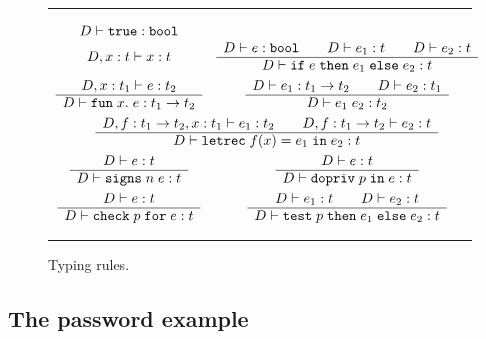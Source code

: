 \documentclass[submission,copyright,creativecommons]{eptcs}
\newcommand{\Rule}[2]{          \begin{array}{c}
  #1 \\\hline
  #2
  \end{array}}
\newcommand{\ifthenelse}[3]{\IF\;#1\;\THEN\;#2\;\ELSE\;#3}
\newcommand{\enable}[2]{\ENABLE\;#1\;\IN\;#2}
\newcommand{\chk}[2]{\CHK\;#1\;\FOR\;#2}
\newcommand{\test}[3]{\TEST\;#1\;\THEN\;#2\;\ELSE\;#3}
\newcommand{\signs}[2]{\SIGNS\;#1\;#2}
\newcommand{\BOOL}{\mbox{\texttt{bool}}}
\newcommand{\ELSE}{\mbox{\texttt{else}}}
\newcommand{\IF}{\mbox{\texttt{if}}}
\newcommand{\FOR}{\mbox{\texttt{for}}}
\newcommand{\IN}{\mbox{\texttt{in}}}
\newcommand{\LET}{\mbox{\texttt{let}}}
\newcommand{\REC}{{\texttt{rec}}}
\newcommand{\THEN}{{\texttt{then}}}
\newcommand{\TRUE}{{\texttt{true}}}
\newcommand{\proves}{\vdash}
\newcommand{\recdecl}[3]{\REC\;#1(#2) = #3}
\newcommand{\ENABLE}{\mbox{\texttt{dopriv}}}
\newcommand{\CHK}{\mbox{\texttt{check}}}
\newcommand{\TEST}{\mbox{\texttt{test}}}
\newcommand{\SIGNS}{\mbox{\texttt{signs}}}
\newcommand{\letdecl}[2]{\LET#1\;\IN\;#2}
\newcommand{\LAM}[2]{{\mathtt{fun}\; #1.\; #2}}
\newcommand{\D}{D} \newcommand{\ty}{t} \renewcommand{\th}{\theta}
\newcommand{\n}{n} \newcommand{\p}{p} \newcommand{\Ps}{\Pi} \newcommand{\h}{h}
\begin{document}
\begin{figure*}
\hrule
\medskip
\[
\begin{array}{cc}
\D\proves \TRUE:\BOOL 
\\
\D,x:\ty\proves x:\ty &
\Rule{\D\proves e:\BOOL  \qquad
      \D\proves e_1:\ty \qquad 
      \D\proves e_2:\ty}
     {\D\proves\ifthenelse{e}{e_1}{e_2}:\ty} 
\\[2ex]
\Rule{\D,x:\ty_1\proves e:\ty_2}
     {\D\proves\LAM{x}{e}:\ty_1\to\ty_2} &
\Rule{\D\proves e_1: \ty_1\to\ty_2\qquad 
      \D\proves e_2: \ty_1}
     {\D\proves e_1\;e_2: \ty_2} 
\\[2ex]
\multicolumn{2}{c}{
\Rule{\D, f:\ty_1\to\ty_2, x:\ty_1
      \proves e_1:\ty_2
      \qquad
      \D, f:\ty_1\to\ty_2\proves e_2:\ty}
     {\D\proves\letdecl{\recdecl{f}{x}{e_1}}{e_2}: \ty} 
}
\\[2ex]
\Rule{\D\proves e:\ty}
     {\D\proves \signs{\n}{e}:\ty} &
\Rule{\D\proves e:\ty}
     {\D\proves \enable{\p}{e}:\ty} 
\\[2ex]
\Rule{\D\proves e:\ty}
     {\D\proves \chk{\p}{e}:\ty} &
\Rule{\D\proves e_1:\ty\qquad
      \D\proves e_2:\ty}
     {\D\proves \test{\p}{e_1}{e_2}:\ty}
\end{array}
\]
\medskip
\hrule
\medskip
\caption{Typing rules.}
\label{fig:typing}
\end{figure*}


\subsection{The password example}
\label{sec:pass}
\end{document}
